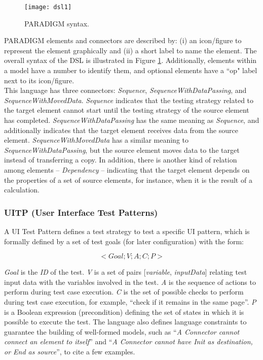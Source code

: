 \begin{center}
\begin{figure}[!htb]
\centering
\texttt{[image: dsl1]}
\caption{PARADIGM syntax.}
\label{fig:dsl1}
\end{figure}
\end{center}

PARADIGM elements and connectors are described by: (i) an icon/figure to represent the element graphically and (ii) a short label to name the element. The overall syntax of the DSL is illustrated in Figure \ref{fig:dsl1}. Additionally, elements within a model have a number to identify them, and optional elements have a ``op" label next to its icon/figure.\\

This language has three connectors: \textit{Sequence}, \textit{SequenceWithDataPassing}, and \textit{SequenceWithMovedData}. \textit{Sequence} indicates that the testing strategy related to the target element cannot start until the testing strategy of the source element has completed. \textit{SequenceWithDataPassing} has the same meaning as \textit{Sequence}, and additionally indicates that the target element receives data from the source element. \textit{SequenceWithMovedData} has a similar meaning to \textit{SequenceWithDataPassing}, but the source element moves data to the target instead of transferring a copy. In addition, there is another kind of relation among elements -- \textit{Dependency} -- indicating that the target element depends on the properties of a set of source elements, for instance, when it is the result of a calculation. \\

\subsubsection{UITP (User Interface Test Patterns)}

A UI Test Pattern defines a test strategy to test a specific UI pattern, which is formally defined by a set of test goals (for later configuration)\cite{moreira2013pattern} with the form:

\begin{equation}< Goal; V; A; C; P >\end{equation}\label{eq:ui_}

\textit{Goal} is the \textit{ID} of the test. \textit{V} is a set of pairs { [\textit{variable}, \textit{inputData}] } relating test input data with the variables involved in the test. \textit{A} is the sequence of actions to perform during test case execution. \textit{C} is the set of possible checks to perform during test case execution, for example, “check if it remains in the same page”. \textit{P} is a Boolean expression (precondition) defining the set of states in which it is possible to execute the test. The language also defines language constraints to guarantee the building of well-formed models, such as ``\textit{A Connector cannot connect an element to itself}'' and ``\textit{A Connector cannot have Init as destination, or End as source}'', to cite a few examples.\\

